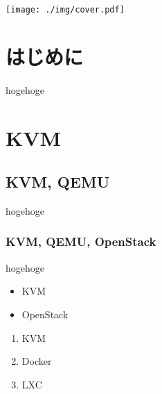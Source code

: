 \documentclass[9pt,b5paper,tombo]{jsbook}
\begin{document}
\enlargethispage{\paperwidth}
\thispagestyle{empty}
\vspace*{-1truein}
\vspace*{-\topmargin}
\vspace*{-\headheight}
\vspace*{-\headsep}
\vspace*{-\topskip}
\noindent\hspace*{-1in}\hspace*{-\oddsidemargin}
\texttt{[image: ./img/cover.pdf]}

\newpage

\thispagestyle{empty}

\tableofcontents

\newpage

\thispagestyle{empty}


\chapter{はじめに}

\setcounter{page}{1}

hogehoge

\chapter{KVM}

\section{KVM, QEMU}

hogehoge

\subsection{KVM, QEMU, OpenStack}

hogehoge

\begin{itemize}
  \item KVM
  \item OpenStack
\end{itemize}


\begin{enumerate}
  \item KVM
  \item Docker
  \item LXC
\end{enumerate}
\end{document}
